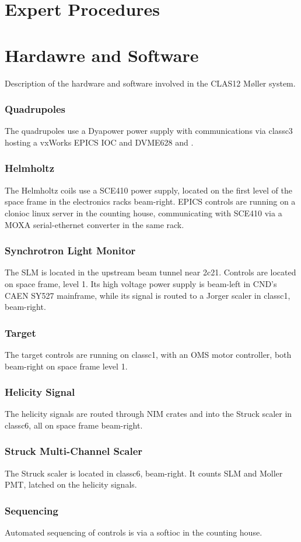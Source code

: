 \documentclass[amsmath,amssymb,notitlepage,12pt]{revtex4}
\begin{document}
\newpage
\begin{appendices}
\section{Expert Procedures}\label{sec:expert}


\newpage
\section{Hardawre and Software}
Description of the hardware and software involved in the CLAS12 M{\o}ller system.
\subsubsection{Quadrupoles}
The quadrupoles use a Dyapower power supply with communications via classc3 hosting a vxWorks EPICS IOC and DVME628 and .
\subsubsection{Helmholtz}
The Helmholtz coils use a SCE410 power supply, located on the first level of the space frame in the electronics racks beam-right.  EPICS controls are running on a clonioc linux server in the counting house, communicating with SCE410 via a MOXA serial-ethernet converter in the same rack. 
\subsubsection{Synchrotron Light Monitor}
The SLM is located in the upstream beam tunnel near 2c21.  Controls are located on space frame, level 1.  Its high voltage power supply is beam-left in CND's  CAEN SY527 mainframe, while its signal is routed to a Jorger scaler in classc1, beam-right.
\subsubsection{Target}
The target controls are running on classc1, with an OMS motor controller, both beam-right on space frame level 1.
\subsubsection{Helicity Signal}
The helicity signals are routed through NIM crates and into the Struck scaler in classc6, all on space frame beam-right. 
\subsubsection{Struck Multi-Channel Scaler}
The Struck scaler is located in classc6, beam-right.  It counts SLM and Moller PMT, latched on the helicity signals.
\subsubsection{Sequencing}
Automated sequencing of controls is via a softioc in the counting house.
\end{appendices}
\end{document}
